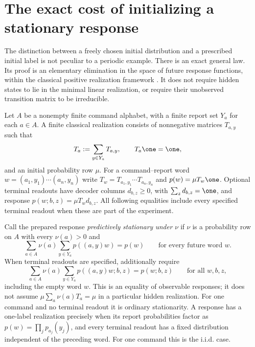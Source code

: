 \section{The exact cost of initializing a stationary response}
\label{sec:r75-stationary-initialization}

The distinction between a freely chosen initial distribution and a
prescribed initial label is not peculiar to a periodic example.  There is
an exact general law.  Its proof is an elementary elimination in the
space of future response functions, within the classical positive
realization framework \cite{Heller65,MonrasWinter14}.  It does not require
hidden states to lie in the minimal linear realization, or require their
unobserved transition matrix to be irreducible.

Let $A$ be a nonempty finite command alphabet, with a finite report set
$Y_a$ for each $a\in A$.  A finite classical realization consists of
nonnegative matrices $T_{a,y}$ such that
\[
 T_a:=\sum_{y\in Y_a}T_{a,y},\qquad T_a\one=\one,
\]
and an initial probability row $\mu$.  For a command--report word
$w=(a_1,y_1)\cdots(a_n,y_n)$ write
$T_w=T_{a_1,y_1}\cdots T_{a_n,y_n}$ and
$p(w)=\mu T_w\one$.  Optional terminal readouts have decoder
columns $d_{b,z}\ge0$, with $\sum_zd_{b,z}=\one$, and response
$p(w;b,z)=\mu T_wd_{b,z}$.  All following equalities include every specified
terminal readout when these are part of the experiment.

Call the prepared response \emph{predictively stationary under $\nu$}
if $\nu$ is a probability row on $A$ with every $\nu(a)>0$ and
\begin{equation}\label{eq:r75-predictive-stationarity}
 \sum_{a\in A}\nu(a)\sum_{y\in Y_a}p((a,y)w)=p(w)
 \qquad\text{for every future word }w.
\end{equation}
When terminal readouts are specified, additionally require
\begin{equation}\label{eq:r75-terminal-stationarity}
 \sum_{a\in A}\nu(a)\sum_{y\in Y_a}p((a,y)w;b,z)=p(w;b,z)
 \qquad\text{for all }w,b,z,
\end{equation}
including the empty word $w$.
This is an equality of observable responses; it does not assume
$\mu\sum_a\nu(a)T_a=\mu$ in a particular hidden realization.  For one
command and no terminal readout it is ordinary stationarity.  A response
has a one-label realization precisely when its report probabilities
factor as $p(w)=\prod_jp_{a_j}(y_j)$, and every terminal readout has a
fixed distribution independent of the preceding word.  For one command
this is the i.i.d. case.

